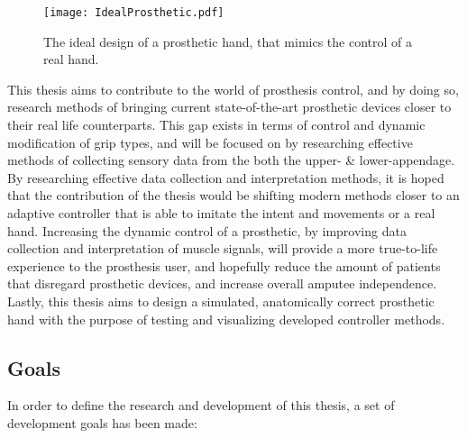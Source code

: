 \documentclass[../main.tex]{subfiles}
\begin{document}
\begin{figure}[h]
\begin{center}
\texttt{[image: IdealProsthetic.pdf]}
\caption{The ideal design of a prosthetic hand, that mimics the control of a real hand.}
\label{fig:idealprosthetic}
\end{center}
\end{figure}

This thesis aims to contribute to the world of prosthesis control, and by doing so, research methods of bringing current state-of-the-art prosthetic devices closer to their real life counterparts.
This gap exists in terms of control and dynamic modification of grip types, and will be focused on by researching effective methods of collecting sensory data from the both the upper- \& lower-appendage.
By researching effective data collection and interpretation methods, it is hoped that the contribution of the thesis would be shifting modern methods closer to an adaptive controller that is able to imitate the intent and movements or a real hand.
Increasing the dynamic control of a prosthetic, by improving data collection and interpretation of  muscle signals, will provide a more true-to-life experience to the prosthesis user, and hopefully reduce the amount of patients that disregard prosthetic devices, and increase overall amputee independence.
Lastly, this thesis aims to design a simulated, anatomically correct prosthetic hand with the purpose of testing and visualizing developed controller methods.


\newpage
\subsection{Goals}
\label{sec:goals}

In order to define the research and development of this thesis, a set of development goals has been made:
\end{document}

